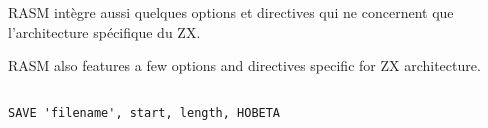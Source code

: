 \section{}\label{PZX}

\begin{xfr}
RASM intègre aussi quelques options et directives qui ne concernent que l'architecture spécifique du ZX.
\end{xfr}

\begin{xen}
RASM also features a few options and directives specific for ZX architecture.
\end{xen}


\subsection{}\label{HOBETA}

\begin{verbatim}
SAVE 'filename', start, length, HOBETA
\end{verbatim}

